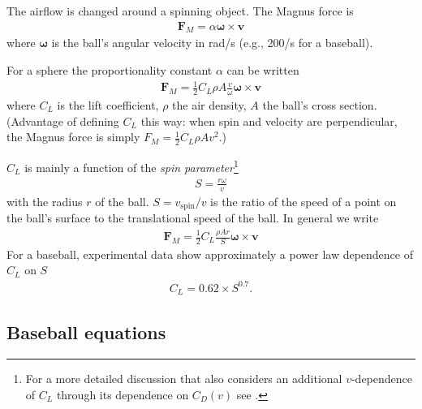 \documentclass[letterpaper]{scrartcl}
\renewcommand{\vec}[1]{\ensuremath{\mathbf{#1}}}
\begin{document}
The airflow is changed around a spinning object. The Magnus force is
\begin{gather}
  \vec{F}_M = \alpha \boldsymbol{\omega} \times \vec{v}
  \label{eq:Fmagnus}
\end{gather}
where $\boldsymbol{\omega}$ is the ball's angular velocity in rad/s
(e.g., 200/s for a baseball).

For a sphere the proportionality constant $\alpha$ can be written
\begin{gather}
  \vec{F}_M = \frac{1}{2} C_L \rho A \frac{v}{\omega}
  \boldsymbol{\omega} \times \vec{v}\label{eq:sphere}  
\end{gather}
where $C_L$ is the lift coefficient, $\rho$ the air density, $A$ the
ball's cross section. (Advantage of defining $C_L$ this way: when spin
and velocity are perpendicular, the Magnus force is simply
$F_M = \frac{1}{2} C_L \rho A v^2$.)

$C_L$ is mainly a function of the \emph{spin parameter}\footnote{For a
  more detailed discussion that also considers an additional
  $v$-dependence of $C_{L}$ through its dependence on $C_{D}(v)$ see
  \citet{Nathan:2008ac}.}
\begin{gather}
  S = \frac{r\omega}{v}\label{eq:S}  
\end{gather}
with the radius $r$ of the ball. $S = v_{\text{spin}}/v$ is the ratio of the speed of a
point on the ball's surface to the translational speed of the ball. In general we write
\begin{gather}
  \vec{F}_M = \frac{1}{2} C_L \frac{\rho A r}{S}
  \boldsymbol{\omega} \times \vec{v}\label{eq:FM}  
\end{gather}
For a baseball, experimental data show approximately a power law dependence of $C_L$ on $S$
\begin{gather}
  C_L = 0.62 \times S^{0.7}\label{eq:CL}.
\end{gather}

\subsection{Baseball equations}
\label{sec:eq}
\end{document}
